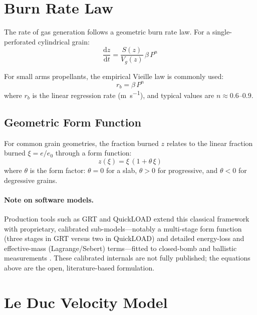 \documentclass[11pt,twoside,openright]{report}
\newcommand{\dd}{\mathrm{d}}
\begin{document}
\section{Burn Rate Law}

The rate of gas generation follows a geometric burn rate law. For a single-perforated cylindrical grain:
\begin{equation}
  \frac{\dd z}{\dd t} = \frac{S(z)}{V_g(z)}\,\beta\,P^n
  \label{eq:burn_rate}
\end{equation}

For small arms propellants, the empirical Vieille law \citep{corner1950interior} is commonly used:
\begin{equation}
  r_b = \beta\,P^n
  \label{eq:vielle}
\end{equation}
where $r_b$ is the linear regression rate (\si{\meter\per\second}), and typical values are $n \approx 0.6$--$0.9$.

\subsection{Geometric Form Function}

For common grain geometries, the fraction burned $z$ relates to the linear fraction burned $\xi = e/e_0$ through a form function:
\begin{equation}
  z(\xi) = \xi\,(1 + \theta\,\xi)
  \label{eq:form_function}
\end{equation}
where $\theta$ is the form factor: $\theta = 0$ for a slab, $\theta > 0$ for progressive, and $\theta < 0$ for degressive grains.

\paragraph{Note on software models.} Production tools such as GRT and QuickLOAD extend this classical framework with proprietary, calibrated sub-models---notably a multi-stage form function (three stages in GRT versus two in QuickLOAD) and detailed energy-loss and effective-mass (Lagrange/Sebert) terms---fitted to closed-bomb and ballistic measurements \citep{corner1950interior,kneubuehl_ballistik,grt_manual,anderson1987ibhvg2}. These calibrated internals are not fully published; the equations above are the open, literature-based formulation.

\section{Le Duc Velocity Model}
\end{document}
